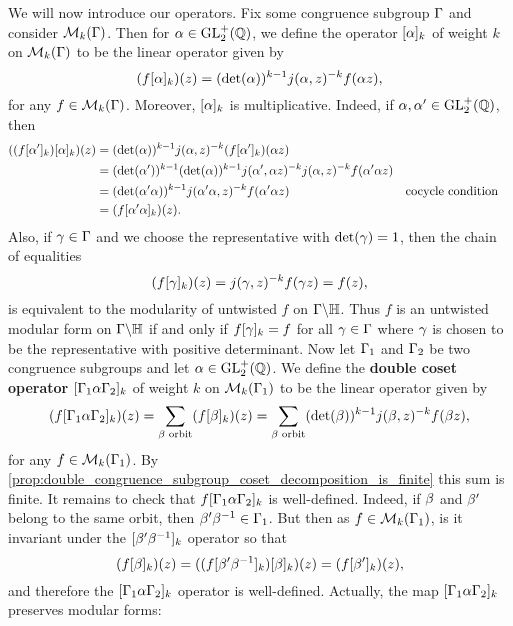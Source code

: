       We will now introduce our operators. Fix some congruence subgroup $\Gamma$ and consider $\mathcal{M}_{k}(\Gamma)$. Then for $\alpha \in \mathrm{GL}_{2}^{+}(\mathbb{Q})$, we define the operator $[\alpha]_{k}$ of weight $k$ on $\mathcal{M}_{k}(\Gamma)$ to be the linear operator given by
      \[
        (f[\alpha]_{k})(z) = (\det(\alpha))^{k-1}j(\alpha,z)^{-k}f(\alpha z),
      \]
      for any $f \in \mathcal{M}_{k}(\Gamma)$. Moreover, $[\alpha]_{k}$ is multiplicative. Indeed, if $\alpha,\alpha' \in \mathrm{GL}_{2}^{+}(\mathbb{Q})$, then
      \begin{align*}
        ((f[\alpha']_{k})[\alpha]_{k})(z) &= (\det(\alpha))^{k-1}j(\alpha,z)^{-k}(f[\alpha']_{k})(\alpha z) \\
        &= (\det(\alpha'))^{k-1}(\det(\alpha))^{k-1}j(\alpha',\alpha z)^{-k}j(\alpha,z)^{-k}f(\alpha'\alpha z) \\
        &= (\det(\alpha'\alpha))^{k-1}j(\alpha'\alpha,z)^{-k}f(\alpha'\alpha z) && \text{cocycle condition} \\
        &= (f[\alpha'\alpha]_{k})(z).
      \end{align*}
      Also, if $\gamma \in \Gamma$ and we choose the representative with $\det(\gamma) = 1$, then the chain of equalities
      \[
        (f[\gamma]_{k})(z) = j(\gamma,z)^{-k}f(\gamma z) = f(z),
      \]
      is equivalent to the modularity of untwisted $f$ on $\Gamma\backslash\mathbb{H}$. Thus $f$ is an untwisted modular form on $\Gamma\backslash\mathbb{H}$ if and only if $f[\gamma]_{k} = f$ for all $\gamma \in \Gamma$ where $\gamma$ is chosen to be the representative with positive determinant. Now let $\Gamma_{1}$ and $\Gamma_{2}$ be two congruence subgroups and let $\alpha \in \mathrm{GL}_{2}^{+}(\mathbb{Q})$. We define the \textbf{double coset operator} $[\Gamma_{1}\alpha\Gamma_{2}]_{k}$ of weight $k$ on $\mathcal{M}_{k}(\Gamma_{1})$ to be the linear operator given by
      \[
        (f[\Gamma_{1}\alpha\Gamma_{2}]_{k})(z) = \sum_{\beta \text{ orbit}}(f[\beta]_{k})(z) = \sum_{\beta \text{ orbit}}(\det(\beta))^{k-1}j(\beta,z)^{-k}f(\beta z),
      \]
      for any $f \in \mathcal{M}_{k}(\Gamma_{1})$. By \cref{prop:double_congruence_subgroup_coset_decomposition_is_finite} this sum is finite. It remains to check that $f[\Gamma_{1}\alpha\Gamma_{2}]_{k}$ is well-defined. Indeed, if $\beta$ and $\beta'$ belong to the same orbit, then $\beta'\beta^{-1} \in \Gamma_{1}$. But then as $f \in \mathcal{M}_{k}(\Gamma_{1})$, is it invariant under the $[\beta'\beta^{-1}]_{k}$ operator so that
      \[
        (f[\beta]_{k})(z) = ((f[\beta'\beta^{-1}]_{k})[\beta]_{k})(z) = (f[\beta']_{k})(z),
      \]
      and therefore the $[\Gamma_{1}\alpha\Gamma_{2}]_{k}$ operator is well-defined. Actually, the map $[\Gamma_{1}\alpha\Gamma_{2}]_{k}$ preserves modular forms:


